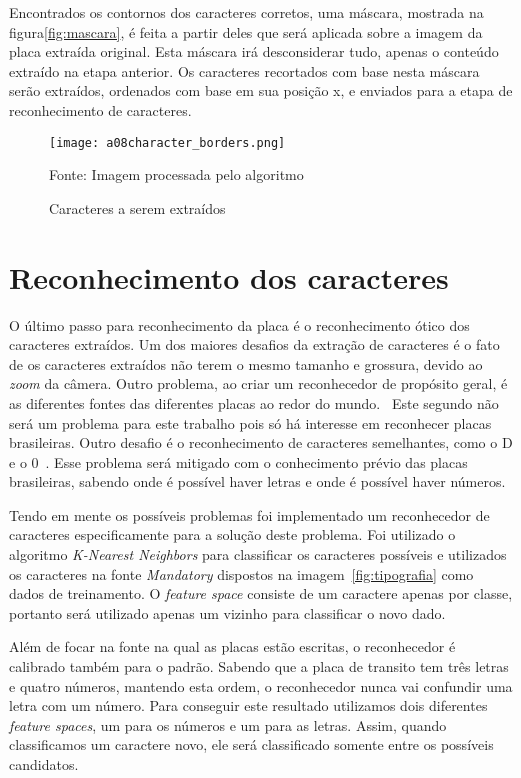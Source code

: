Encontrados os contornos dos caracteres corretos, uma máscara, mostrada na figura\ref{fig:mascara}, é feita a partir deles que será aplicada sobre a imagem da placa extraída original. Esta máscara irá desconsiderar tudo, apenas o conteúdo extraído na etapa anterior. Os caracteres recortados com base nesta máscara serão extraídos, ordenados com base em sua posição x, e enviados para a etapa de reconhecimento de caracteres.

\begin{figure}[H]
	\centering
	\texttt{[image: a08character\_borders.png]}
	\caption{Caracteres a serem extraídos}
Fonte: Imagem processada pelo algoritmo
	\label{fig:caracteres_extraidos}
\end{figure}

\section{Reconhecimento dos caracteres} \label{sec:reconhecimento}

O último passo para reconhecimento da placa é o reconhecimento ótico dos
caracteres extraídos. Um dos maiores desafios da extração de caracteres é o fato de
os caracteres extraídos não terem o mesmo tamanho e grossura, devido ao
\emph{zoom} da câmera. Outro problema, ao criar um reconhecedor de propósito
geral, é as diferentes fontes das diferentes placas ao redor do mundo.~\cite{s2013automatic}
Este segundo não será um problema para este trabalho pois
só há interesse em reconhecer placas brasileiras. Outro desafio é o
reconhecimento de caracteres semelhantes, como o D e o
0~\cite{ho2016intelligent}.  Esse problema será mitigado com o conhecimento
prévio das placas brasileiras, sabendo onde é possível haver letras e onde é
possível haver números.

Tendo em mente os possíveis problemas foi implementado um reconhecedor de caracteres especificamente para a solução deste problema. Foi utilizado o algoritmo \emph{K-Nearest Neighbors} para classificar os caracteres possíveis e utilizados os caracteres na fonte \emph{Mandatory} dispostos na imagem~\ref{fig:tipografia} como dados de treinamento. O \emph{feature space} consiste de um caractere apenas por classe, portanto será utilizado apenas um vizinho para classificar o novo dado.

Além de focar na fonte na qual as placas estão escritas, o reconhecedor é calibrado também para o padrão. Sabendo que a placa de transito tem três letras e quatro números, mantendo esta ordem, o reconhecedor nunca vai confundir uma letra com um número. Para conseguir este resultado utilizamos dois diferentes \emph{feature spaces}, um para os números e um para as letras. Assim, quando classificamos um caractere novo, ele será classificado somente entre os possíveis candidatos.


